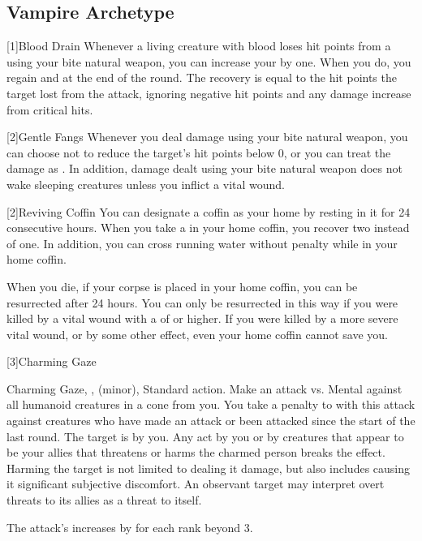   \subsection{Vampire Archetype}

    [1]{Blood Drain} Whenever a living creature with blood loses hit points from a  using your bite natural weapon, you can increase your  by one.
      When you do, you regain  and  at the end of the round.
      The recovery is equal to the hit points the target lost from the attack, ignoring negative hit points and any damage increase from critical hits.

    [2]{Gentle Fangs} Whenever you deal damage using your bite natural weapon, you can choose not to reduce the target's hit points below 0, or you can treat the damage as .
      In addition, damage dealt using your bite natural weapon does not wake sleeping creatures unless you inflict a vital wound.

    [2]{Reviving Coffin} You can designate a coffin as your home by resting in it for 24 consecutive hours.
      When you take a  in your home coffin, you recover two  instead of one.
      In addition, you can cross running water without penalty while in your home coffin.

      When you die, if your corpse is placed in your home coffin, you can be resurrected after 24 hours.
      You can only be resurrected in this way if you were killed by a vital wound with a  of  or higher.
      If you were killed by a more severe vital wound, or by some other effect, even your home coffin cannot save you.

    [3]{Charming Gaze}
      \begin{magicalsustainability}{Charming Gaze}{, ,  (minor), }
        \abilityusagetime Standard action.
        \rankline
        Make an attack vs. Mental against all humanoid creatures in a \largearea cone from you.
        You take a  penalty to  with this attack against creatures who have made an attack or been attacked since the start of the last round.
        \hit The target is \charmed by you.
        Any act by you or by creatures that appear to be your allies that threatens or harms the charmed person breaks the effect.
        Harming the target is not limited to dealing it damage, but also includes causing it significant subjective discomfort.
        An observant target may interpret overt threats to its allies as a threat to itself.

        \rankline
        The attack's  increases by  for each rank beyond 3.
      \end{magicalsustainability}

